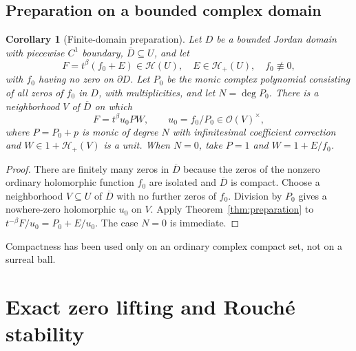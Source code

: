 \documentclass[11pt,a4paper]{article}
\newtheorem{corollary}[theorem]{Corollary}
\theoremstyle{definition}\newtheorem{definition}[theorem]{Definition}
\theoremstyle{remark}\newtheorem{remark}[theorem]{Remark}
\newcommand{\A}{\mathscr H}\newcommand{\hol}{\mathcal O}
\numberwithin{equation}{section}
\begin{document}
\subsection{Preparation on a bounded complex domain}
\begin{corollary}[Finite-domain preparation]\label{cor:domainprep}
Let $D$ be a bounded Jordan domain with piecewise $C^1$ boundary, $\overline D\subseteq U$, and let
\[
 F=t^\beta(f_0+E)\in\A(U),\quad E\in\A_+(U),\quad
 f_0\not\equiv0,
\]
with $f_0$ having no zero on $\partial D$. Let $P_0$ be the monic complex polynomial consisting of all zeros of $f_0$ in $D$, with multiplicities, and let $N=\deg P_0$. There is a neighborhood $V$ of $\overline D$ on which
\begin{equation}\label{eq:domainprep}
 F=t^\beta u_0PW,
 \qquad u_0=f_0/P_0\in\hol(V)^\times,
\end{equation}
where $P=P_0+p$ is monic of degree $N$ with infinitesimal coefficient correction and $W\in1+\A_+(V)$ is a unit. When $N=0$, take $P=1$ and $W=1+E/f_0$.
\end{corollary}
\begin{proof}
There are finitely many zeros in $\overline D$ because the zeros of the nonzero ordinary holomorphic function $f_0$ are isolated and $\overline D$ is compact. Choose a neighborhood $V\subseteq U$ of $\overline D$ with no further zeros of $f_0$. Division by $P_0$ gives a nowhere-zero holomorphic $u_0$ on $V$. Apply Theorem~\ref{thm:preparation} to
$t^{-\beta}F/u_0=P_0+E/u_0$. The case $N=0$ is immediate.
\end{proof}
Compactness has been used only on an ordinary complex compact set, not on a surreal ball.

\section{Exact zero lifting and Rouch\'e stability}\label{sec:zeros}
\end{document}
